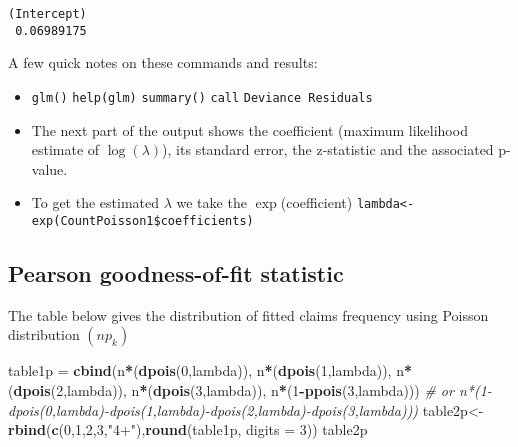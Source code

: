 \documentclass[]{book}
\newenvironment{Shaded}{\begin{snugshade}}{\end{snugshade}}
\newcommand{\KeywordTok}[1]{\textcolor[rgb]{0.13,0.29,0.53}{\textbf{#1}}}
\newcommand{\DataTypeTok}[1]{\textcolor[rgb]{0.13,0.29,0.53}{#1}}
\newcommand{\DecValTok}[1]{\textcolor[rgb]{0.00,0.00,0.81}{#1}}
\newcommand{\StringTok}[1]{\textcolor[rgb]{0.31,0.60,0.02}{#1}}
\newcommand{\CommentTok}[1]{\textcolor[rgb]{0.56,0.35,0.01}{\textit{#1}}}
\newcommand{\OperatorTok}[1]{\textcolor[rgb]{0.81,0.36,0.00}{\textbf{#1}}}
\newcommand{\NormalTok}[1]{#1}
\providecommand{\tightlist}{%
  \setlength{\itemsep}{0pt}\setlength{\parskip}{0pt}}
\theoremstyle{definition}
\theoremstyle{definition}
\theoremstyle{definition}
\theoremstyle{remark}
\begin{document}
\begin{Shaded}
\end{Shaded}

\begin{verbatim}
(Intercept) 
 0.06989175 
\end{verbatim}

A few quick notes on these commands and results:

\begin{itemize}
\tightlist
\item
  \texttt{glm()} \texttt{help(glm)} \texttt{summary()} \texttt{call}
  \texttt{Deviance\ Residuals}
\item
  The next part of the output shows the coefficient (maximum likelihood
  estimate of \(\log(\lambda)\)), its standard error, the z-statistic
  and the associated p-value.
\item
  To get the estimated \(\lambda\) we take the \(\exp\)(coefficient)
  \texttt{lambda\textless{}-exp(CountPoisson1\$coefficients)}
\end{itemize}

\subsection{Pearson goodness-of-fit
statistic}\label{pearson-goodness-of-fit-statistic-1}

The table below gives the distribution of fitted claims frequency using
Poisson distribution \((np_k)\)

\begin{Shaded}
\begin{Highlighting}[]
\NormalTok{table1p =}\StringTok{ }\KeywordTok{cbind}\NormalTok{(n}\OperatorTok{*}\NormalTok{(}\KeywordTok{dpois}\NormalTok{(}\DecValTok{0}\NormalTok{,lambda)),}
\NormalTok{                n}\OperatorTok{*}\NormalTok{(}\KeywordTok{dpois}\NormalTok{(}\DecValTok{1}\NormalTok{,lambda)),}
\NormalTok{                n}\OperatorTok{*}\NormalTok{(}\KeywordTok{dpois}\NormalTok{(}\DecValTok{2}\NormalTok{,lambda)),}
\NormalTok{                n}\OperatorTok{*}\NormalTok{(}\KeywordTok{dpois}\NormalTok{(}\DecValTok{3}\NormalTok{,lambda)),}
\NormalTok{                n}\OperatorTok{*}\NormalTok{(}\DecValTok{1}\OperatorTok{-}\KeywordTok{ppois}\NormalTok{(}\DecValTok{3}\NormalTok{,lambda))) }\CommentTok{# or n*(1-dpois(0,lambda)-dpois(1,lambda)-dpois(2,lambda)-dpois(3,lambda)))}
\NormalTok{table2p<-}\KeywordTok{rbind}\NormalTok{(}\KeywordTok{c}\NormalTok{(}\DecValTok{0}\NormalTok{,}\DecValTok{1}\NormalTok{,}\DecValTok{2}\NormalTok{,}\DecValTok{3}\NormalTok{,}\StringTok{"4+"}\NormalTok{),}\KeywordTok{round}\NormalTok{(table1p, }\DataTypeTok{digits =} \DecValTok{3}\NormalTok{))}
\NormalTok{table2p}
\end{Highlighting}
\end{Shaded}
\end{document}
